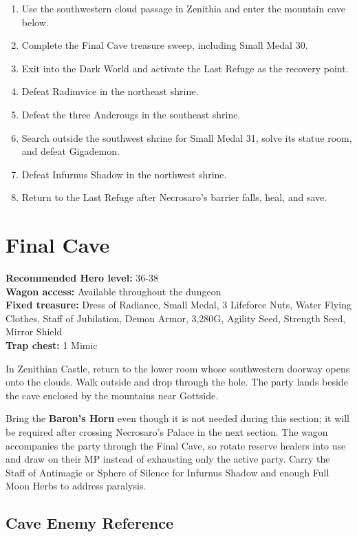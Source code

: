 \documentclass[
  american,
  10pt,
  letterpaper,
  oneside,
  open=any]{scrreprt}
\providecommand{\tightlist}{%
  \setlength{\itemsep}{0pt}\setlength{\parskip}{0pt}}
\begin{document}
\begin{enumerate}
\def\labelenumi{\arabic{enumi}.}
\tightlist
\item
  Use the southwestern cloud passage in Zenithia and enter the mountain
  cave below.
\item
  Complete the Final Cave treasure sweep, including Small Medal 30.
\item
  Exit into the Dark World and activate the Last Refuge as the recovery
  point.
\item
  Defeat Radimvice in the northeast shrine.
\item
  Defeat the three Anderougs in the southeast shrine.
\item
  Search outside the southwest shrine for Small Medal 31, solve its
  statue room, and defeat Gigademon.
\item
  Defeat Infurnus Shadow in the northwest shrine.
\item
  Return to the Last Refuge after Necrosaro's barrier falls, heal, and
  save.
\end{enumerate}

\section{Final Cave}\label{final-cave}

\textbf{Recommended Hero level:} 36-38\\
\textbf{Wagon access:} Available throughout the dungeon\\
\textbf{Fixed treasure:} Dress of Radiance, Small Medal, 3 Lifeforce
Nuts, Water Flying Clothes, Staff of Jubilation, Demon Armor, 3,280G,
Agility Seed, Strength Seed, Mirror Shield\\
\textbf{Trap chest:} 1 Mimic

In Zenithian Castle, return to the lower room whose southwestern doorway
opens onto the clouds. Walk outside and drop through the hole. The party
lands beside the cave enclosed by the mountains near Gottside.

Bring the \textbf{Baron's Horn} even though it is not needed during this
section; it will be required after crossing Necrosaro's Palace in the
next section. The wagon accompanies the party through the Final Cave, so
rotate reserve healers into use and draw on their MP instead of
exhausting only the active party. Carry the Staff of Antimagic or Sphere
of Silence for Infurnus Shadow and enough Full Moon Herbs to address
paralysis.

\subsection{Cave Enemy Reference}\label{cave-enemy-reference}
\end{document}

